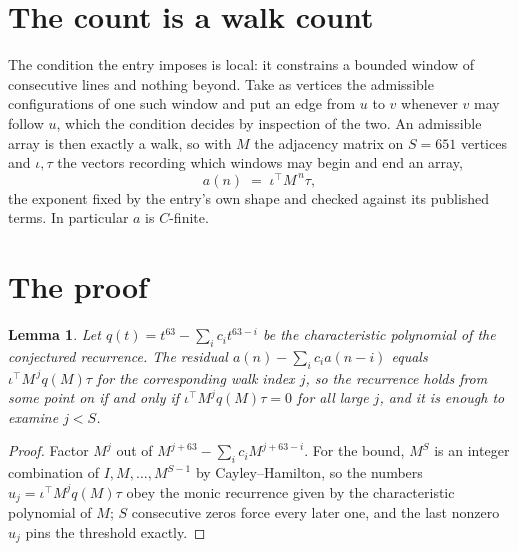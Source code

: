 \documentclass[11pt,a4paper]{article}
\theoremstyle{plain}
\newtheorem{lemma}[theorem]{Lemma}
\theoremstyle{definition}
\begin{document}
\section{The count is a walk count}

The condition the entry imposes is local: it constrains a bounded window of consecutive lines and nothing beyond. Take as
vertices the admissible configurations of one such window and put an edge from $u$ to $v$
whenever $v$ may follow $u$, which the condition decides by inspection of the two. An
admissible array is then exactly a walk, so with $M$ the adjacency matrix on $S=651$ vertices
and $\iota,\tau$ the vectors recording which windows may begin and end an array,
\[
a(n)\;=\;\iota^{\!\top}M^{\,n}\tau ,
\]
the exponent fixed by the entry's own shape and checked against its published terms. In
particular $a$ is $C$-finite.

\section{The proof}

\begin{lemma}\label{lem:crit}
Let $q(t)=t^{63}-\sum_i c_it^{63-i}$ be the characteristic polynomial of the
conjectured recurrence. The residual $a(n)-\sum_ic_ia(n-i)$ equals
$\iota^{\!\top}M^{\,j}q(M)\tau$ for the corresponding walk index $j$, so the recurrence
holds from some point on if and only if $\iota^{\!\top}M^{j}q(M)\tau=0$ for all large $j$,
and it is enough to examine $j<S$.
\end{lemma}

\begin{proof}
Factor $M^{j}$ out of $M^{j+63}-\sum_ic_iM^{j+63-i}$. For the bound, $M^{S}$
is an integer combination of $I,M,\dots,M^{S-1}$ by Cayley--Hamilton, so the numbers
$u_j=\iota^{\!\top}M^{j}q(M)\tau$ obey the monic recurrence given by the characteristic
polynomial of $M$; $S$ consecutive zeros force every later one, and the last nonzero $u_j$
pins the threshold exactly.
\end{proof}
\end{document}

